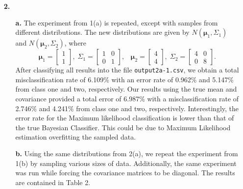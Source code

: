 \documentclass[ 12pt ]{article}
\begin{document}
\begin{enumerate}
\begin{enumerate}
        \end{enumerate}

    \item[\textbf{2.}] $ $
        \begin{enumerate}
            \item[\textbf{a.}] The experiment from 1(a) is repeated, except with samples from different distributions. The new distributions are given by $N(\boldsymbol{\mu}_1, \Sigma_1)$ and $N(\boldsymbol{\mu}_2, \Sigma_2)$, where $$\boldsymbol{\mu}_1 = \begin{bmatrix} 1 \\ 1
\end{bmatrix},\; \Sigma_1 = \begin{bmatrix} 1 & 0 \\ 0 & 1 \end{bmatrix},\;\;\; \boldsymbol{\mu}_2 = \begin{bmatrix} 4 \\ 4 \end{bmatrix},\; \Sigma_2 = \begin{bmatrix} 4 & 0 \\ 0 & 8 \end{bmatrix}.$$ After classifying all results into the file \verb|output2a-1.csv|, we obtain a total misclassification rate of 6.109\% with an error rate of 0.962\% and 5.147\% from class one and two, respectively. Our results using the true mean and covariance provided a total error of 6.987\% with a misclassification rate of 2.746\% and 4.241\% from class one and two, respectively. Interestingly, the error rate for the Maximum likelihood classification is lower than that of the true Bayesian Classifier. This could be due to Maximum Likelihood estimation overfitting the sampled data.

            \item[\textbf{b.}] Using the same distributions from 2(a), we repeat the experiment from 1(b) by sampling various sizes of data. Additionally, the same experiment was run while forcing the covariance matrices to be diagonal. The results are contained in Table 2.
\begin{center}
                

\end{center}
\end{enumerate}
\end{enumerate}
\end{document}
